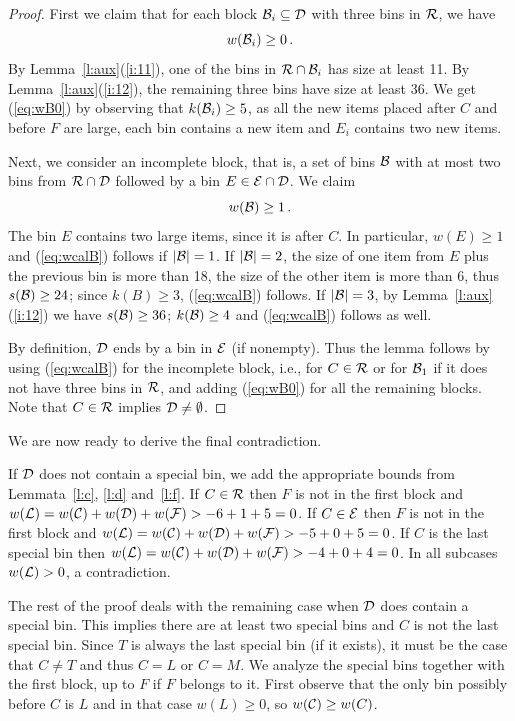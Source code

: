 \begin{proof}
First we claim that for each block ${\mathcal B}_i\subseteq{\mathcal D}$ with three
bins in ${\mathcal R}$, we have 
\begin{equation}
\label{eq:wB0}
w({\mathcal B}_i)\geq 0\,.
\end{equation} 
By Lemma~\ref{l:aux}(\ref{i:11}), one of the bins in ${\mathcal R}\cap{\mathcal B}_i$
has size at least 11. By Lemma~\ref{l:aux}(\ref{i:12}), the remaining
three bins have size at least 36. We get (\ref{eq:wB0}) by observing that
$k({\mathcal B}_i)\geq 5$, as all the new items placed after $C$ and
before $F$ are large, each bin
contains a new item and $E_i$ contains two new items.

Next, we consider an incomplete block, that is,
a set of bins ${\mathcal B}$ with at most two bins
from ${\mathcal R}\cap{\mathcal D}$ followed by a bin $E\in{\mathcal E}\cap{\mathcal D}$.
We claim 
\begin{equation}
\label{eq:wcalB}
w({\mathcal B})\geq 1\,. 
\end{equation}
The bin $E$ contains two large items, since it is after $C$. In particular,
$w(E)\geq 1$ and (\ref{eq:wcalB}) follows if $|{\mathcal B}|=1$. If $|{\mathcal B}|=2$, the
size of one item from $E$ plus the previous bin is more than 18, the
size of the other item is more than 6, thus $s({\mathcal B})\geq 24$; since
$k(B)\geq 3$, (\ref{eq:wcalB}) follows.  If $|{\mathcal B}|=3$, by
Lemma~\ref{l:aux}(\ref{i:12}) we have $s({\mathcal B})\geq 36$; $k({\mathcal B})\geq
4$ and (\ref{eq:wcalB}) follows as well.

By definition, ${\mathcal D}$ ends by a bin in ${\mathcal E}$ (if nonempty). Thus
the lemma follows by using (\ref{eq:wcalB}) for the incomplete block,
i.e., for $C\in{\mathcal R}$ or for ${\mathcal B}_1$ if it does not have three bins
in ${\mathcal R}$, and adding (\ref{eq:wB0}) for all the remaining blocks.
Note that $C\in{\mathcal R}$ implies ${\mathcal D}\not=\emptyset$.
\end{proof}

We are now ready to derive the final contradiction. 

If ${\mathcal D}$ does not contain a special bin, we add the
appropriate bounds from Lemmata~\ref{l:c}, \ref{l:d} and~\ref{l:f}.
If $C\in{\mathcal R}$ then $F$ is not in the first block and
$w({\mathcal L})=w({\mathcal C})+w({\mathcal D})+w({\mathcal F})>-6+1+5=0$.  If $C\in{\mathcal E}$ then
$F$ is not in the first block and
$w({\mathcal L})=w({\mathcal C})+w({\mathcal D})+w({\mathcal F})>-5+0+5=0$.  If $C$ is the last
special bin then $w({\mathcal L})=w({\mathcal C})+w({\mathcal D})+w({\mathcal F})>-4+0+4=0$. In
all subcases $w({\mathcal L})>0$, a contradiction.

The rest of the proof deals with the remaining case when ${\mathcal D}$ does
contain a special bin. This implies there are at least two special
bins and $C$ is not the last special bin. Since $T$ is always the last
special bin (if it exists), it must be the case that $C\neq T$ and
thus $C=L$ or $C=M$.  We analyze the special bins together with the
first block, up to $F$ if $F$ belongs to it.  First observe that the
only bin possibly before $C$ is $L$ and in that case $w(L)\ge0$, so
$w({\mathcal C})\geq w(C)$.

